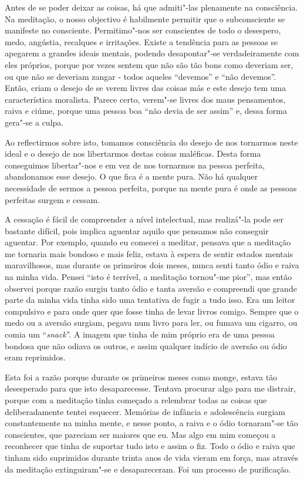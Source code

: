Antes de se poder deixar as coisas, há que admiti"-las plenamente na consciência.
Na meditação, o nosso objectivo é habilmente permitir que o subconsciente se
manifeste no consciente. Permitimo"-nos ser conscientes de todo o desespero, medo, 
angústia, recalques e irritações. Existe a tendência para as
pessoas se apegarem a grandes ideais mentais, podendo desapontar"-se
verdadeiramente com eles próprios, porque por vezes sentem que não são tão bons
como deveriam ser, ou que não se deveriam zangar - todos aqueles “devemos” e “não
devemos”. Então, criam o desejo de se verem livres das coisas más e este desejo
tem uma característica moralista. Parece certo, verem"-se livres dos maus pensamentos,
raiva e ciúme, porque uma pessoa boa “não devia de ser assim” e, dessa forma
gera"-se a culpa.

Ao reflectirmos sobre isto, tomamos consciência do desejo de nos tornarmos neste
ideal e o desejo de nos libertarmos destas coisas maléficas. Desta forma conseguimos
libertar"-nos e em vez de nos tornarmos na pessoa perfeita, abandonamos esse
desejo. O que fica é a mente pura. Não há qualquer necessidade de sermos a
pessoa perfeita, porque na mente pura é onde as pessoas perfeitas surgem e
cessam.

A cessação é fácil de compreender a nível intelectual, mas realizá"-la pode ser
bastante difícil, pois implica aguentar aquilo que pensamos não conseguir aguentar. 
Por exemplo, quando eu comecei a meditar, pensava que a meditação me tornaria mais
bondoso e mais feliz, estava à espera de sentir estados mentais maravilhosos,
mas durante os primeiros dois meses, nunca senti tanto ódio e raiva na minha
vida. Pensei “isto é terrível, a meditação tornou"-me pior”, mas então observei
porque razão surgiu tanto ódio e tanta aversão e compreendi que grande parte da
minha vida tinha sido uma tentativa de fugir a tudo isso. Era um leitor
compulsivo e para onde quer que fosse tinha de levar livros comigo. Sempre que o
medo ou a aversão surgiam, pegava num livro para ler, ou fumava um cigarro, ou
comia um “\emph{snack}”. A imagem que tinha de mim próprio era de uma pessoa
bondosa que não odiava os outros, e assim qualquer indício de aversão ou ódio eram
reprimidos.

Esta foi a razão porque durante os primeiros meses como monge, estava tão
desesperado para que isto desaparecesse. Tentava procurar algo para me distrair,
porque com a meditação tinha começado a relembrar todas as coisas que
deliberadamente tentei esquecer. Memórias de infância e adolescência surgiam
constantemente na minha mente, e nesse ponto, a raiva e o ódio tornaram"-se tão
conscientes, que pareciam ser maiores que eu. Mas algo em mim começou a
reconhecer que tinha de suportar tudo isto e assim o fiz. Todo o ódio e raiva
que tinham sido suprimidos durante trinta anos de vida vieram em força, mas
através da meditação extinguiram"-se e desapareceram. Foi um processo de
purificação.

